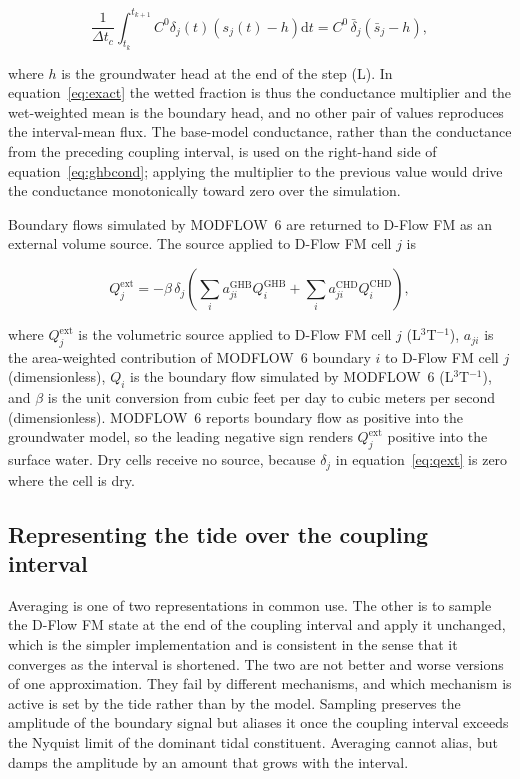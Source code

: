 \documentclass[preprint,authoryear,11pt]{elsarticle}
\begin{document}
\begin{equation}
  \frac{1}{\Delta t_{c}} \int_{t_{k}}^{t_{k+1}} C^{0} \delta_{j}(t)
      \left( s_{j}(t) - h \right) \mathrm{d}t
    = C^{0} \, \bar{\delta}_{j} \left( \bar{s}_{j} - h \right) ,
  \label{eq:exact}
\end{equation}

\noindent where $h$ is the groundwater head at the end of the step (L). In equation~\ref{eq:exact} the wetted fraction is thus the conductance multiplier and the wet-weighted mean is the boundary head, and no other pair of values reproduces the interval-mean flux. The base-model conductance, rather than the conductance from the preceding coupling interval, is used on the right-hand side of equation~\ref{eq:ghbcond}; applying the multiplier to the previous value would drive the conductance monotonically toward zero over the simulation.

Boundary flows simulated by MODFLOW~6 are returned to D-Flow FM as an external volume source. The source applied to D-Flow FM cell $j$ is

\begin{equation}
  Q_{j}^{\mathrm{ext}} = -\beta \, \delta_{j}
    \left( \sum_{i} a_{ji}^{\mathrm{GHB}} Q_{i}^{\mathrm{GHB}}
         + \sum_{i} a_{ji}^{\mathrm{CHD}} Q_{i}^{\mathrm{CHD}} \right) ,
  \label{eq:qext}
\end{equation}

\noindent where $Q_{j}^{\mathrm{ext}}$ is the volumetric source applied to D-Flow FM cell $j$ (L$^{3}$T$^{-1}$), $a_{ji}$ is the area-weighted contribution of MODFLOW~6 boundary $i$ to D-Flow FM cell $j$ (dimensionless), $Q_{i}$ is the boundary flow simulated by MODFLOW~6 (L$^{3}$T$^{-1}$), and $\beta$ is the unit conversion from cubic feet per day to cubic meters per second (dimensionless). MODFLOW~6 reports boundary flow as positive into the groundwater model, so the leading negative sign renders $Q_{j}^{\mathrm{ext}}$ positive into the surface water. Dry cells receive no source, because $\delta_{j}$ in equation~\ref{eq:qext} is zero where the cell is dry.

\subsection{Representing the tide over the coupling interval}
\label{sec:reduction}

Averaging is one of two representations in common use. The other is to sample the D-Flow FM state at the end of the coupling interval and apply it unchanged, which is the simpler implementation and is consistent in the sense that it converges as the interval is shortened. The two are not better and worse versions of one approximation. They fail by different mechanisms, and which mechanism is active is set by the tide rather than by the model. Sampling preserves the amplitude of the boundary signal but aliases it once the coupling interval exceeds the Nyquist limit of the dominant tidal constituent. Averaging cannot alias, but damps the amplitude by an amount that grows with the interval.
\end{document}

